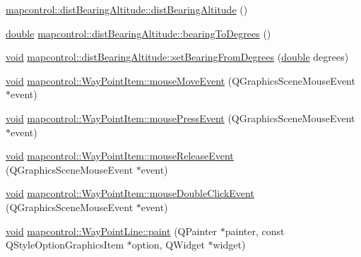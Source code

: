 \begin{DoxyCompactItemize}
\hyperlink{group___o_p_map_widget_ga0ccea3ba9da45c99f65b815917fe7e31}{mapcontrol\-::dist\-Bearing\-Altitude\-::dist\-Bearing\-Altitude} ()
\item 
\hyperlink{_super_l_u_support_8h_a8956b2b9f49bf918deed98379d159ca7}{double} \hyperlink{group___o_p_map_widget_ga6c6805690915c378c1d294ebf621a7cf}{mapcontrol\-::dist\-Bearing\-Altitude\-::bearing\-To\-Degrees} ()
\item 
\hyperlink{group___u_a_v_objects_plugin_ga444cf2ff3f0ecbe028adce838d373f5c}{void} \hyperlink{group___o_p_map_widget_gacf717a0d69700f372c04dcee7f550dea}{mapcontrol\-::dist\-Bearing\-Altitude\-::set\-Bearing\-From\-Degrees} (\hyperlink{_super_l_u_support_8h_a8956b2b9f49bf918deed98379d159ca7}{double} degrees)
\item 
\hyperlink{group___u_a_v_objects_plugin_ga444cf2ff3f0ecbe028adce838d373f5c}{void} \hyperlink{group___o_p_map_widget_ga6f89cd987bfc43501b2d48b05a98e542}{mapcontrol\-::\-Way\-Point\-Item\-::mouse\-Move\-Event} (Q\-Graphics\-Scene\-Mouse\-Event $\ast$event)
\item 
\hyperlink{group___u_a_v_objects_plugin_ga444cf2ff3f0ecbe028adce838d373f5c}{void} \hyperlink{group___o_p_map_widget_ga75c88df34476dc60c89f8611fec5868b}{mapcontrol\-::\-Way\-Point\-Item\-::mouse\-Press\-Event} (Q\-Graphics\-Scene\-Mouse\-Event $\ast$event)
\item 
\hyperlink{group___u_a_v_objects_plugin_ga444cf2ff3f0ecbe028adce838d373f5c}{void} \hyperlink{group___o_p_map_widget_gab66a8c1572009dbf0caad4c9a0109cfa}{mapcontrol\-::\-Way\-Point\-Item\-::mouse\-Release\-Event} (Q\-Graphics\-Scene\-Mouse\-Event $\ast$event)
\item 
\hyperlink{group___u_a_v_objects_plugin_ga444cf2ff3f0ecbe028adce838d373f5c}{void} \hyperlink{group___o_p_map_widget_ga8e95fece0c41ca37ee7878e84a03e700}{mapcontrol\-::\-Way\-Point\-Item\-::mouse\-Double\-Click\-Event} (Q\-Graphics\-Scene\-Mouse\-Event $\ast$event)
\item 
\hyperlink{group___u_a_v_objects_plugin_ga444cf2ff3f0ecbe028adce838d373f5c}{void} \hyperlink{group___o_p_map_widget_ga7e02fb7136fabae7e6ffe0e8db29e747}{mapcontrol\-::\-Way\-Point\-Line\-::paint} (Q\-Painter $\ast$painter, const Q\-Style\-Option\-Graphics\-Item $\ast$option, Q\-Widget $\ast$widget)
\end{DoxyCompactItemize}

